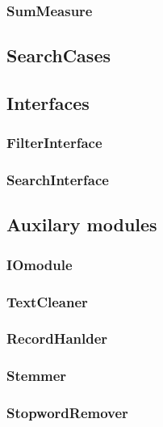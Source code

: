 \subsubsection{SumMeasure}


\subsection*{SearchCases}


\subsection*{Interfaces}
\subsubsection{FilterInterface}

\subsubsection{SearchInterface}


\subsection*{Auxilary modules}
\subsubsection{IOmodule}

\subsubsection{TextCleaner}

\subsubsection{RecordHanlder}

\subsubsection{Stemmer}

\subsubsection{StopwordRemover}


